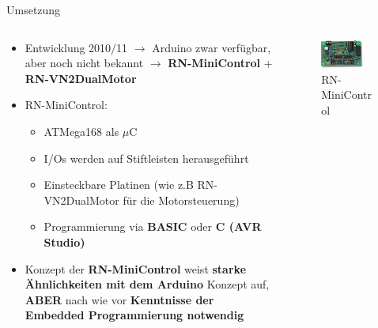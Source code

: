 \documentclass{beamer}
\begin{document}
\begin{frame}{Umsetzung}
\begin{columns}
	\begin{column}{0.7\textwidth}
\begin{itemize}
	\item Entwicklung 2010/11 $\rightarrow$ Arduino zwar verf\"ugbar, aber noch nicht bekannt $\rightarrow$ \textbf{RN-MiniControl} + \textbf{RN-VN2DualMotor}
\end{itemize}
\begin{itemize}
	\item RN-MiniControl:
	\begin{itemize}
		\item ATMega168 als $\mu$C
		\item I/Os werden auf Stiftleisten herausgef\"uhrt
		\item Einsteckbare Platinen (wie z.B RN-VN2DualMotor f\"ur die Motorsteuerung)
		\item Programmierung via \textbf{BASIC} oder \textbf{C (AVR Studio)}
	\end{itemize}
\end{itemize}
\begin{itemize}
	\item Konzept der \textbf{RN-MiniControl} weist \textbf{starke \"Ahnlichkeiten mit dem Arduino} Konzept auf, \textbf{ABER} nach wie vor \textbf{Kenntnisse der Embedded Programmierung notwendig}
\end{itemize}
	\end{column}
	\begin{column}{0.3\textwidth}
	\begin{figure}
		\centering
		\includegraphics[width=0.8\textwidth]{./images/rn-minicontrol.jpg}
		\caption{RN-MiniControl\cite{Image:RNMiniControl}}
	\end{figure}
	\begin{figure}

\end{figure}
\end{column}
\end{columns}
\end{frame}
\end{document}
